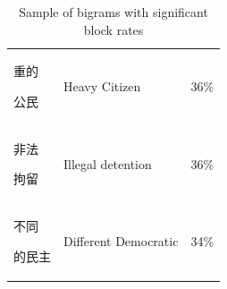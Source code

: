 \begin{table}[t]
\begin{center}
{\begin{tabular}{ l | l | c }
        \begin{CJK*}{UTF8}{gbsn}重的\end{CJK*} \begin{CJK*}{UTF8}{gbsn}公民\end{CJK*} & Heavy Citizen & 36\% \\
        \begin{CJK*}{UTF8}{gbsn}非法\end{CJK*} \begin{CJK*}{UTF8}{gbsn}拘留\end{CJK*} & Illegal detention
                          & 36\% \\
        \begin{CJK*}{UTF8}{gbsn}不同\end{CJK*} \begin{CJK*}{UTF8}{gbsn}的民主\end{CJK*} & Different Democratic & 34\% \\
      \end{tabular}}
  \end{center}
  \caption{\label{effective-bigrams}Sample of bigrams with significant
    block rates}
\end{table}

